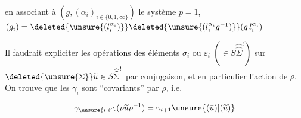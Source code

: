
en associant à $(g,(\alpha_i)_{i\in\{0,1,\infty\}})$ le système  $p=1$, $(g_i)=\deleted{\unsure{(l_i^{\alpha_i})}}\deleted{\unsure{(l_i^{\alpha_i}g^{-1})}}(g\,l_i^{\alpha_i})$


Il faudrait expliciter les opérations des éléments $\sigma_i$ ou $\varepsilon_i$  $(\in S\widehat{\widehat\Sigma}^{!})$ sur $\deleted{\unsure{\Sigma}}\widetilde u\in S\widehat{\widehat\Sigma}^{!}$  par conjugaison, et en particulier l'action de $\rho$. On trouve que  les $\gamma_i$ sont ``covariants'' par $\rho$, i.e.

\[
\gamma_{\unsure{i|i'}}(\rho\widetilde u\rho^{-1})=\gamma_{i+1}\unsure{(\bar u)|(\widetilde u)}
\]

